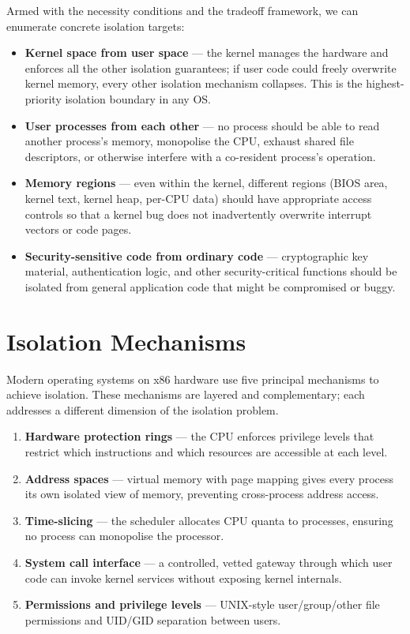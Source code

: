 \documentclass[11pt]{article}
\begin{document}
Armed with the necessity conditions and the tradeoff framework, we can enumerate concrete
isolation targets:

\begin{itemize}
    \item \textbf{Kernel space from user space} --- the kernel manages the hardware and
          enforces all the other isolation guarantees; if user code could freely overwrite
          kernel memory, every other isolation mechanism collapses. This is the highest-priority
          isolation boundary in any OS.
    \item \textbf{User processes from each other} --- no process should be able to read
          another process's memory, monopolise the CPU, exhaust shared file descriptors, or
          otherwise interfere with a co-resident process's operation.
    \item \textbf{Memory regions} --- even within the kernel, different regions (BIOS area,
          kernel text, kernel heap, per-CPU data) should have appropriate access controls so
          that a kernel bug does not inadvertently overwrite interrupt vectors or code pages.
    \item \textbf{Security-sensitive code from ordinary code} --- cryptographic key material,
          authentication logic, and other security-critical functions should be isolated from
          general application code that might be compromised or buggy.
\end{itemize}

\section{Isolation Mechanisms}

Modern operating systems on x86 hardware use five principal mechanisms to achieve
isolation. These mechanisms are layered and complementary; each addresses a different
dimension of the isolation problem.

\begin{enumerate}
    \item \textbf{Hardware protection rings} --- the CPU enforces privilege levels that
          restrict which instructions and which resources are accessible at each level.
    \item \textbf{Address spaces} --- virtual memory with page mapping gives every process
          its own isolated view of memory, preventing cross-process address access.
    \item \textbf{Time-slicing} --- the scheduler allocates CPU quanta to processes,
          ensuring no process can monopolise the processor.
    \item \textbf{System call interface} --- a controlled, vetted gateway through which user
          code can invoke kernel services without exposing kernel internals.
    \item \textbf{Permissions and privilege levels} --- UNIX-style user/group/other file
          permissions and UID/GID separation between users.
\end{enumerate}
\end{document}
